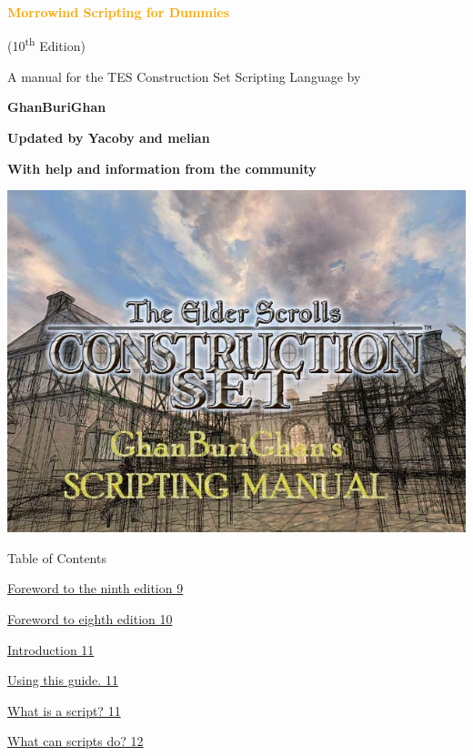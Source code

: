 \documentclass[
]{article}
\author{}
\date{}
\begin{document}

\begin{center}
	{\Huge \textcolor{orange}{\textbf{Morrowind Scripting for Dummies}}}
	
	{\LARGE (10\textsuperscript{th} Edition)}
	
	{\Large A manual for the TES Construction Set Scripting Language by
		
	\textbf{GhanBuriGhan}
		
	\textbf{Updated by Yacoby and melian}}
	
	{\large \textbf{With help and information from the community}}
\end{center}

\includegraphics{media/image1.jpg} %

\clearpage

Table of Contents

\protect\hyperlink{foreword-to-the-ninth-edition}{Foreword to the ninth
edition 9}

\protect\hyperlink{foreword-to-eighth-edition}{Foreword to eighth
edition 10}

\protect\hyperlink{_Toc53412549}{Introduction 11}

\protect\hyperlink{using-this-guide.}{Using this guide. 11}

\protect\hyperlink{what-is-a-script}{What is a script? 11}

\protect\hyperlink{what-can-scripts-do}{What can scripts do? 12}
\end{document}
